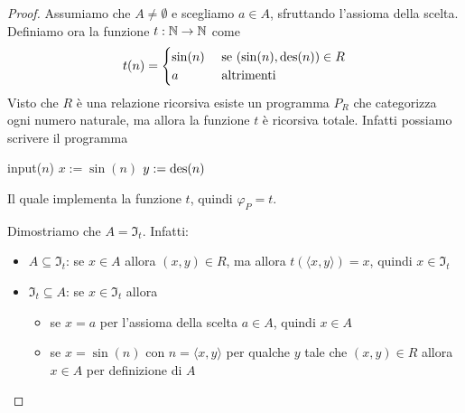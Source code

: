 \begin{proof}
	Assumiamo che $A \neq \emptyset$ e scegliamo $a \in A$, sfruttando l'assioma della scelta. Definiamo ora la funzione $t: \mathbb{N} \rightarrow \mathbb{N}$ come
	$$
	t(n) = \begin{cases}
		\sin (n) & \text{ se } (\sin(n), \operatorname{des}(n)) \in R \\
		a & \text{ altrimenti}
	\end{cases}
	$$
	Visto che $R$ è una relazione ricorsiva esiste un programma $P_R$ che categorizza ogni numero naturale, ma allora la funzione $t$ è ricorsiva totale. Infatti possiamo scrivere il programma

	\begin{center}
		\begin{minipage}{.6\textwidth}
			\begin{tcolorbox}[
				colback=white,
				sharp corners,
				boxrule=.3mm,
				left=20pt,
				top=0pt,
				bottom=0pt
				]
				\begin{algorithm}[H]
					\SetAlgoNoEnd
					input($n$)\;
					$x:=\sin(n)$\;
					$y:=\operatorname{des}(n)$\;
				\end{algorithm}
			\end{tcolorbox}
		\end{minipage}
	\end{center}

	Il quale implementa la funzione $t$, quindi $\varphi_P = t$.

	Dimostriamo che $A = \Im_t$. Infatti:
	\begin{itemize}
		\item $A \subseteq \Im_t$: se $x \in A$ allora $(x,y) \in R$, ma allora $t (\langle x,y \rangle) = x$, quindi $x \in \Im_t$
        
		\item $\Im_t \subseteq A$: se $x \in \Im_t$ allora
		\begin{itemize}
			\item se $x = a$ per l'assioma della scelta $a \in A$, quindi $x \in A$
		
        	\item se $x = \sin(n)$ con $n = \langle x,y \rangle$ per qualche $y$ tale che $(x,y) \in R$ allora $x \in A$ per definizione di $A$
		\end{itemize}
	\end{itemize}
\end{proof}

